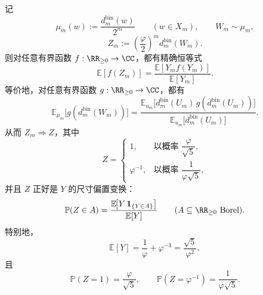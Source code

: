 \begin{theorem}[微态推前谱是均匀基线纤维谱的精确尺寸偏置变换]\label{thm:xi-time-part60ab4-exact-sizebias-pushforward-law}
记
\[
\mu_m(w):=\frac{d_m^{\mathrm{bin}}(w)}{2^m}
\qquad (w\in X_m),
\qquad
W_m\sim \mu_m,
\]
\[
Z_m:=\left(\frac{\varphi}{2}\right)^m d_m^{\mathrm{bin}}(W_m).
\]
则对任意有界函数 \(f:\RR_{\ge 0}\to\CC\)，都有精确恒等式
\[
\mathbb E[f(Z_m)]
=
\frac{\mathbb E[Y_m f(Y_m)]}{\mathbb E[Y_m]}.
\]
等价地，对任意有界函数 \(g:\RR_{\ge 0}\to\CC\)，都有
\[
\mathbb E_{\mu_m}\!\bigl[g(d_m^{\mathrm{bin}}(W_m))\bigr]
=
\frac{
\mathbb E_{u_m}\!\bigl[d_m^{\mathrm{bin}}(U_m)\,g(d_m^{\mathrm{bin}}(U_m))\bigr]
}{
\mathbb E_{u_m}\!\bigl[d_m^{\mathrm{bin}}(U_m)\bigr]
}.
\]
从而 \(Z_m\Longrightarrow Z\)，其中
\[
Z=
\begin{cases}
1, & \text{以概率 } \dfrac{\varphi}{\sqrt5},\\[6pt]
\varphi^{-1}, & \text{以概率 } \dfrac{1}{\varphi\sqrt5},
\end{cases}
\]
并且 \(Z\) 正好是 \(Y\) 的尺寸偏置变换：
\[
\mathbb P(Z\in A)
=
\frac{\mathbb E\!\bigl[Y\,\mathbf 1_{\{Y\in A\}}\bigr]}{\mathbb E[Y]}
\qquad
(A\subseteq \RR_{\ge 0}\ \text{Borel}).
\]
特别地，
\[
\mathbb E[Y]
=
\frac{1}{\varphi}+\varphi^{-3}
=
\frac{\sqrt5}{\varphi^2},
\]
且
\[
\mathbb P(Z=1)=\frac{\varphi}{\sqrt5},
\qquad
\mathbb P(Z=\varphi^{-1})=\frac{1}{\varphi\sqrt5}.
\]
\end{theorem}
